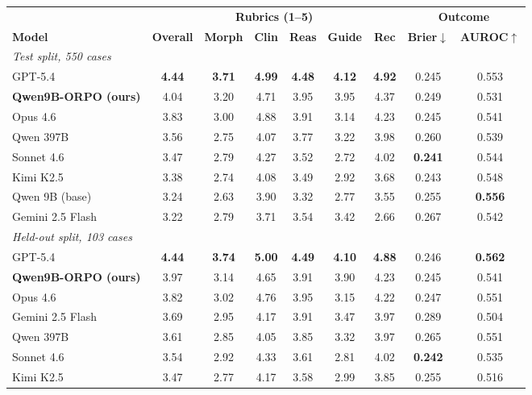 \begin{table}[H]
\centering
\small
\setlength{\tabcolsep}{3.2pt}
\begin{tabular}{lcccccccc}
\toprule
& \multicolumn{6}{c}{\textbf{Rubrics (1--5)}} & \multicolumn{2}{c}{\textbf{Outcome}} \\
\cmidrule(lr){2-7}\cmidrule(lr){8-9}
\textbf{Model} & \textbf{Overall} & \textbf{Morph} & \textbf{Clin} & \textbf{Reas} &
\textbf{Guide} & \textbf{Rec} & \textbf{Brier}$\downarrow$ & \textbf{AUROC}$\uparrow$ \\
\midrule
\multicolumn{9}{l}{\emph{Test split, 550 cases}} \\
GPT-5.4 & \textbf{4.44} & \textbf{3.71} & \textbf{4.99} & \textbf{4.48} & \textbf{4.12} & \textbf{4.92} & 0.245 & 0.553 \\
\textbf{Qwen9B-ORPO (ours)} & 4.04 & 3.20 & 4.71 & 3.95 & 3.95 & 4.37 & 0.249 & 0.531 \\
Opus 4.6 & 3.83 & 3.00 & 4.88 & 3.91 & 3.14 & 4.23 & 0.245 & 0.541 \\
Qwen 397B & 3.56 & 2.75 & 4.07 & 3.77 & 3.22 & 3.98 & 0.260 & 0.539 \\
Sonnet 4.6 & 3.47 & 2.79 & 4.27 & 3.52 & 2.72 & 4.02 & \textbf{0.241} & 0.544 \\
Kimi K2.5 & 3.38 & 2.74 & 4.08 & 3.49 & 2.92 & 3.68 & 0.243 & 0.548 \\
Qwen 9B (base) & 3.24 & 2.63 & 3.90 & 3.32 & 2.77 & 3.55 & 0.255 & \textbf{0.556} \\
Gemini 2.5 Flash & 3.22 & 2.79 & 3.71 & 3.54 & 3.42 & 2.66 & 0.267 & 0.542 \\
\midrule
\multicolumn{9}{l}{\emph{Held-out split, 103 cases}} \\
GPT-5.4 & \textbf{4.44} & \textbf{3.74} & \textbf{5.00} & \textbf{4.49} & \textbf{4.10} & \textbf{4.88} & 0.246 & \textbf{0.562} \\
\textbf{Qwen9B-ORPO (ours)} & 3.97 & 3.14 & 4.65 & 3.91 & 3.90 & 4.23 & 0.245 & 0.541 \\
Opus 4.6 & 3.82 & 3.02 & 4.76 & 3.95 & 3.15 & 4.22 & 0.247 & 0.551 \\
Gemini 2.5 Flash & 3.69 & 2.95 & 4.17 & 3.91 & 3.47 & 3.97 & 0.289 & 0.504 \\
Qwen 397B & 3.61 & 2.85 & 4.05 & 3.85 & 3.32 & 3.97 & 0.265 & 0.551 \\
Sonnet 4.6 & 3.54 & 2.92 & 4.33 & 3.61 & 2.81 & 4.02 & \textbf{0.242} & 0.535 \\
Kimi K2.5 & 3.47 & 2.77 & 4.17 & 3.58 & 2.99 & 3.85 & 0.255 & 0.516 \\

\end{tabular}
\end{table}
